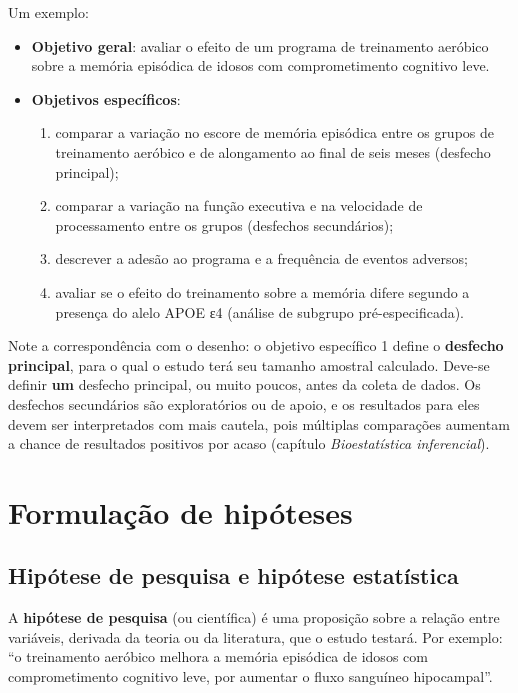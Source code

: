 \documentclass[
]{book}
\providecommand{\tightlist}{%
  \setlength{\itemsep}{0pt}\setlength{\parskip}{0pt}}
\begin{document}
Um exemplo:

\begin{itemize}
\tightlist
\item
  \textbf{Objetivo geral}: avaliar o efeito de um programa de treinamento aeróbico sobre a memória episódica de idosos com comprometimento cognitivo leve.
\item
  \textbf{Objetivos específicos}:

  \begin{enumerate}
  \def\labelenumi{\arabic{enumi}.}
  \tightlist
  \item
    comparar a variação no escore de memória episódica entre os grupos de treinamento aeróbico e de alongamento ao final de seis meses (desfecho principal);
  \item
    comparar a variação na função executiva e na velocidade de processamento entre os grupos (desfechos secundários);
  \item
    descrever a adesão ao programa e a frequência de eventos adversos;
  \item
    avaliar se o efeito do treinamento sobre a memória difere segundo a presença do alelo APOE ε4 (análise de subgrupo pré-especificada).
  \end{enumerate}
\end{itemize}

Note a correspondência com o desenho: o objetivo específico 1 define o \textbf{desfecho principal}, para o qual o estudo terá seu tamanho amostral calculado. Deve-se definir \textbf{um} desfecho principal, ou muito poucos, antes da coleta de dados. Os desfechos secundários são exploratórios ou de apoio, e os resultados para eles devem ser interpretados com mais cautela, pois múltiplas comparações aumentam a chance de resultados positivos por acaso (capítulo \emph{Bioestatística inferencial}).

\section{Formulação de hipóteses}\label{formulauxe7uxe3o-de-hipuxf3teses}

\subsection{Hipótese de pesquisa e hipótese estatística}\label{hipuxf3tese-de-pesquisa-e-hipuxf3tese-estatuxedstica}

A \textbf{hipótese de pesquisa} (ou científica) é uma proposição sobre a relação entre variáveis, derivada da teoria ou da literatura, que o estudo testará. Por exemplo: ``o treinamento aeróbico melhora a memória episódica de idosos com comprometimento cognitivo leve, por aumentar o fluxo sanguíneo hipocampal''.
\end{document}

